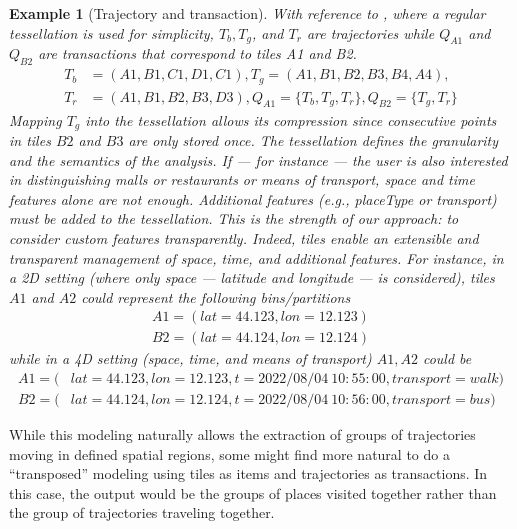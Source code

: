 \documentclass[preprint,12pt,authoryear]{elsarticle} %
\newtheorem{example}{Example}
\begin{document}
\begin{example}[Trajectory and transaction]
With reference to , where a regular tessellation is used for simplicity, $T_b,T_g$, and $T_r$ are trajectories while $Q_{A1}$ and $Q_{B2}$ are transactions that correspond to tiles A1 and B2.
{\small
\begin{align*}
    T_b&= (A1, B1, C1, D1, C1),
    T_g = (A1, B1, B2, B3, B4, A4),\\
    T_r&= (A1, B1, B2, B3, D3),Q_{A1}=\{T_b, T_g, T_r \},Q_{B2}= \{T_g, T_r \}
\end{align*}
}
\noindent Mapping $T_g$ into the tessellation allows its compression since consecutive points in tiles $B2$ and $B3$ are only stored once. 
The tessellation defines the granularity and the semantics of the analysis.
If --- for instance --- the user is also interested in distinguishing malls or restaurants or means of transport, space and time features alone are not enough.
Additional features (e.g., placeType or transport) must be added to the tessellation.
This is the strength of our approach: to consider custom features transparently.
Indeed, tiles enable an extensible and transparent management of space, time, and additional features.
For instance, in a 2D setting (where only space --- latitude and longitude --- is considered), tiles $A1$ and $A2$ could represent the following bins/partitions 
{\small
\begin{align*}
A1 = (lat=44.123, lon=12.123)\\
B2 = (lat=44.124, lon=12.124)   
\end{align*}}
\noindent while in a 4D setting (space, time, and means of transport) $A1,A2$ could be
{\small
\begin{align*}
A1 = (&lat=44.123, lon=12.123, t=2022/08/04~10:55:00, transport=walk)\\
B2 = (&lat=44.124, lon=12.124, t=2022/08/04~10:56:00, transport=bus)
\end{align*}}
\end{example}
%
While this modeling naturally allows the extraction of groups of trajectories moving in defined spatial regions, some might find more natural to do a ``transposed'' modeling using tiles as items and trajectories as transactions.
In this case, the output would be the groups of places visited together rather than the group of trajectories traveling together.
\end{document}
